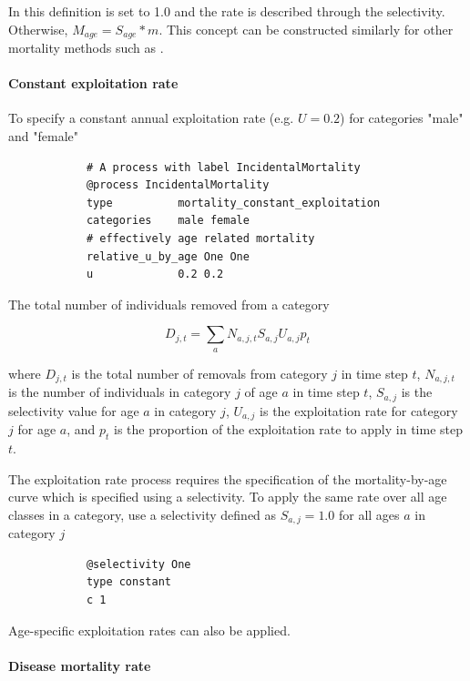 
In this definition  is set to 1.0 and the rate is described through the selectivity. Otherwise, $M_{age} = S_{age} * m$. This concept can be constructed similarly for other mortality methods such as .

\paragraph{Constant exploitation rate}\label{sec:Process-MortalityConstantExploitation} 

To specify a constant annual exploitation rate (e.g. $U=0.2$) for categories "male" and "female"

{\small{\begin{verbatim}
			# A process with label IncidentalMortality
			@process IncidentalMortality
			type          mortality_constant_exploitation
			categories    male female
			# effectively age related mortality
			relative_u_by_age One One
			u             0.2 0.2
\end{verbatim}}}

The total number of individuals removed from a category

\begin{equation}
	D_{j,t} = \sum_a N_{a,j,t} S_{a,j} U_{a,j} p_t
\end{equation}

where $D_{j,t}$ is the total number of removals from category $j$ in time step $t$, $N_{a,j,t}$ is the number of individuals in category $j$ of age $a$ in time step $t$, $S_{a,j}$ is the selectivity value for age $a$ in category $j$, $U_{a,j}$ is the exploitation rate for category $j$ for age $a$, and $p_t$ is the proportion of the exploitation rate to apply in time step $t$.

The exploitation rate process requires the specification of the mortality-by-age curve which is specified using a selectivity. To apply the same rate over all age classes in a category, use a selectivity defined as $S_{a,j}=1.0$ for all ages $a$ in category $j$

{\small{\begin{verbatim}
			@selectivity One
			type constant
			c 1
\end{verbatim}}}

Age-specific exploitation rates can also be applied.

\paragraph{Disease mortality rate}\label{sec:Process-Age-DiseaseMortalityRate}

